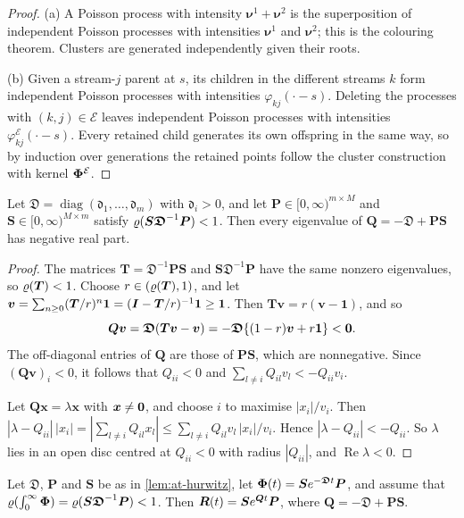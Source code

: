 \begin{proof}
(a) A Poisson process with intensity $\bm\nu^1+\bm\nu^2$ is the superposition of
independent Poisson processes with intensities $\bm\nu^1$ and $\bm\nu^2$; this is the
colouring theorem. Clusters are generated independently given their roots.

(b) Given a stream-$j$ parent at $s$, its children in the different streams $k$ form
independent Poisson processes with intensities $\varphi_{kj}(\cdot-s)$. Deleting the
processes with $(k,j)\in\mathcal E$ leaves independent Poisson processes with
intensities $\varphi^{\mathcal E}_{kj}(\cdot-s)$. Every retained child generates its
own offspring in the same way, so by induction over generations the retained points
follow the cluster construction with kernel $\bm{\Phi}^{\mathcal E}$.
\end{proof}

\begin{lemma}\label{lem:at-hurwitz}
Let $\bm{\mathfrak D}=\operatorname{diag}(\mathfrak d_1,\dots,\mathfrak d_m)$ with
$\mathfrak d_i>0$, and let $\bm P\in[0,\infty)^{m\times M}$ and
$\bm S\in[0,\infty)^{M\times m}$ satisfy $\varrho(\bm S\bm{\mathfrak D}^{-1}\bm P)<1$. Then
every eigenvalue of $\bm Q=-\bm{\mathfrak D}+\bm P\bm S$ has negative real part.
\end{lemma}

\begin{proof}
The matrices $\bm T=\bm{\mathfrak D}^{-1}\bm P\bm S$ and $\bm S\bm{\mathfrak D}^{-1}\bm P$
have the same nonzero eigenvalues, so $\varrho(\bm T)<1$. Choose
$r\in(\varrho(\bm T),1)$, and let
$\bm v=\sum_{n\ge0}(\bm T/r)^n\mathbf 1=(\bm{I}-\bm T/r)^{-1}\mathbf 1\ge\mathbf 1$.
Then $\bm T\bm v=r(\bm v-\mathbf 1)$, and so
\[
\bm Q\bm v=\bm{\mathfrak D}(\bm T\bm v-\bm v)
=-\bm{\mathfrak D}\{(1-r)\bm v+r\mathbf 1\}<\mathbf{0} .
\]
The off-diagonal entries of $\bm Q$ are those of $\bm P\bm S$, which are nonnegative.
Since $(\bm Q\bm v)_i<0$, it follows that $Q_{ii}<0$ and
$\sum_{l\neq i}Q_{il}v_l<-Q_{ii}v_i$.

Let $\bm Q\bm x=\lambda\bm x$ with $\bm x\neq\mathbf{0}$, and choose $i$ to maximise
$|x_i|/v_i$. Then
$|\lambda-Q_{ii}|\,|x_i|=|\sum_{l\neq i}Q_{il}x_l|\le\sum_{l\neq i}Q_{il}v_l\,|x_i|/v_i$.
Hence $|\lambda-Q_{ii}|<-Q_{ii}$. So $\lambda$ lies in an open disc centred at
$Q_{ii}<0$ with radius $|Q_{ii}|$, and $\operatorname{Re}\lambda<0$.
\end{proof}

\begin{lemma}\label{lem:at-expkernel}
Let $\bm{\mathfrak D}$, $\bm P$ and $\bm S$ be as in \cref{lem:at-hurwitz}, let
$\bm{\Phi}(t)=\bm S e^{-\bm{\mathfrak D}t}\bm P$, and assume that
$\varrho(\int_0^\infty\bm{\Phi})=\varrho(\bm S\bm{\mathfrak D}^{-1}\bm P)<1$. Then
$\bm{R}(t)=\bm S e^{\bm Qt}\bm P$, where $\bm Q=-\bm{\mathfrak D}+\bm P\bm S$.
\end{lemma}

